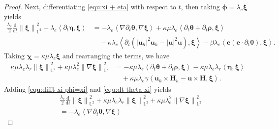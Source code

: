 \documentclass[11pt, reqno]{amsart}
\theoremstyle{definition}
\theoremstyle{remark}
\numberwithin{equation}{section}
\newcommand{\bff}{\boldsymbol}
\newcommand{\bb}{\mathbb}
\newcommand{\ddt}{\frac{\mathrm{d}}{\mathrm{d}t}}
\newcommand{\norm}[2]{\left\|{#1}\right\|_{#2}}
\newcommand{\inpro}[2]{\left\langle#1,#2\right\rangle}
\begin{document}
\begin{proof}

Next, differentiating \eqref{equ:xi + eta} with respect to $t$, then taking $\bff{\phi}= \lambda_e \bff{\xi}$ yields
\begin{align}\label{equ:difft xi phi=xi}
	\nonumber
	\frac{\lambda_e}{2} \ddt \norm{\bff{\xi}}{\bb{L}^2}^2
	+
	\lambda_e \inpro{\partial_t \bff{\eta}}{\bff{\xi}}
	&=
	-
	\lambda_e \inpro{\nabla \partial_t \bff{\theta}}{\nabla \bff{\xi}}
	+
	\kappa\mu \lambda_e \inpro{\partial_t \bff{\theta}+ \partial_t\bff{\rho}}{\bff{\xi}}
	\\
	&\quad
	-
	\kappa \lambda_e \inpro{\partial_t(|\bff{u}_h|^2 \bff{u}_h - |\bff{u}|^2 \bff{u})}{\bff{\xi}}
	-
	\beta\lambda_e \inpro{\bff{e}(\bff{e}\cdot\partial_t \bff{\theta})}{\bff{\xi}}.
\end{align}
Taking $\bff{\chi}=\kappa\mu\lambda_e \bff{\xi}$ and rearranging the terms, we have
\begin{align}\label{equ:dt theta xi}
	\nonumber
	\kappa\mu\lambda_e \lambda_r \norm{\bff{\xi}}{\bb{L}^2}^2
	+
	\kappa\mu \lambda_e^2 \norm{\nabla \bff{\xi}}{\bb{L}^2}^2
	&=
	-
	\kappa\mu\lambda_e \inpro{\partial_t \bff{\theta}+\partial_t \bff{\rho}}{\bff{\xi}}
	-
	\kappa\mu\lambda_e \lambda_r \inpro{\bff{\eta}}{\bff{\xi}}
	\\
	&\quad
	+
	\kappa\mu\lambda_e \gamma \inpro{\bff{u}_h \times \bff{H}_h- \bff{u}\times \bff{H}}{\bff{\xi}}.
\end{align}
Adding \eqref{equ:difft xi phi=xi} and \eqref{equ:dt theta xi} yields
\begin{align}\label{equ:add xi dt}
	\nonumber
	&\frac{\lambda_e}{2} \ddt \norm{\bff{\xi}}{\bb{L}^2}^2
	+
	\kappa\mu\lambda_e\lambda_r \norm{\bff{\xi}}{\bb{L}^2}^2
	+
	\kappa\mu\lambda_e^2 \norm{\nabla \bff{\xi}}{\bb{L}^2}^2
	\\
	\nonumber
	&=
	-
	\lambda_e \inpro{\nabla \partial_t \bff{\theta}}{\nabla \bff{\xi}}

\end{align}
\end{proof}
\end{document}

